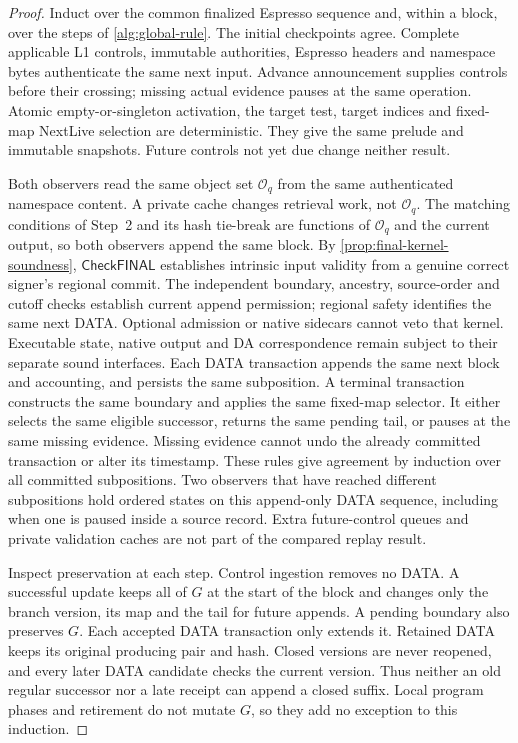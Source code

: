 \documentclass[11pt,a4paper]{article}
\newcommand{\tagg}[1]{\ensuremath{\mathsf{#1}}}
\begin{document}
\begin{proof}
Induct over the common finalized Espresso sequence and, within a block,
over the steps of \cref{alg:global-rule}.
The initial checkpoints agree. Complete applicable L1 controls,
immutable authorities, Espresso headers and namespace bytes authenticate
the same next input. Advance announcement supplies controls before their
crossing; missing actual evidence pauses at the same operation. Atomic
empty-or-singleton activation, the target test, target indices and fixed-map
NextLive selection are deterministic. They give the same prelude and
immutable snapshots. Future controls not yet due change neither result.

Both observers read the same object set $\mathcal O_q$ from the same
authenticated namespace content. A private cache changes retrieval work,
not $\mathcal O_q$. The matching conditions of Step~2 and its hash tie-break are
functions of $\mathcal O_q$ and the current output, so both observers
append the same block. By \cref{prop:final-kernel-soundness},
\tagg{CheckFINAL} establishes intrinsic input validity from a genuine
correct signer's regional commit. The independent boundary, ancestry,
source-order and cutoff checks establish current append permission;
regional safety identifies the same next DATA. Optional admission or
native sidecars cannot veto that kernel. Executable state, native output
and DA correspondence remain subject to their separate sound interfaces. Each DATA transaction appends the
same next block and accounting, and persists the same subposition.
A terminal transaction constructs the same boundary and applies the same
fixed-map selector. It either selects the same eligible successor, returns
the same pending tail, or pauses at the same missing evidence. Missing evidence
cannot undo the already committed transaction or alter its timestamp.
These rules give agreement by induction over all committed subpositions.
Two observers that have reached different subpositions hold ordered
states on this append-only DATA sequence, including when one is paused
inside a source record. Extra future-control queues and private validation
caches are not part of the compared replay result.

Inspect preservation at each step. Control ingestion removes no DATA. A
successful update keeps all of $G$ at the start of the block and changes
only the branch version, its map and the tail for future appends. A
pending boundary also preserves $G$. Each accepted DATA transaction only extends it. Retained DATA keeps its
original producing pair and hash. Closed versions are never reopened,
and every later DATA candidate checks the current version. Thus
neither an old regular successor nor a late receipt can append a closed
suffix. Local program phases and retirement do not mutate $G$, so they
add no exception to this induction.
\end{proof}
\end{document}
